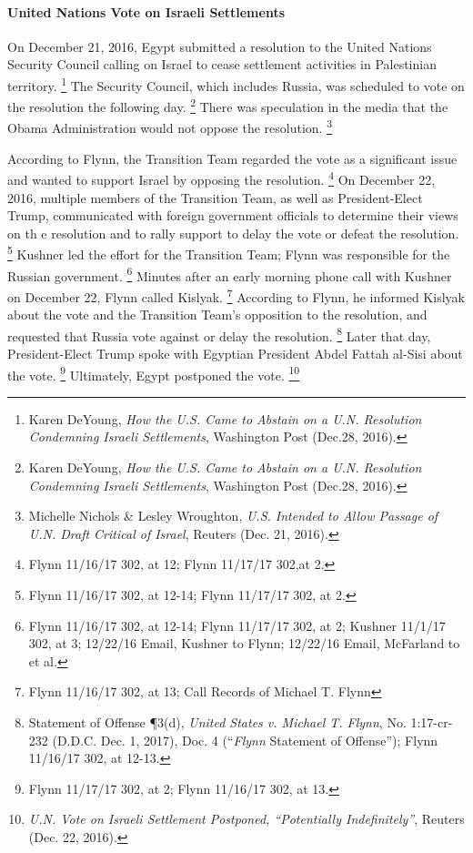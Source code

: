 \paragraph{United Nations Vote on Israeli Settlements}

On December 21, 2016, Egypt submitted a resolution to the United Nations Security Council calling on Israel to cease settlement activities in Palestinian territory.%
\footnote{Karen DeYoung, \textit{How the U.S. Came to Abstain on a U.N. Resolution Condemning Israeli Settlements}, Washington Post (Dec.28, 2016).}
The Security Council, which includes Russia, was scheduled to vote on the resolution the following day.%
\footnote{Karen DeYoung, \textit{How the U.S. Came to Abstain on a U.N. Resolution Condemning Israeli Settlements}, Washington Post (Dec.28, 2016).}
There was speculation in the media that the Obama Administration would not oppose the resolution.%
\footnote{Michelle Nichols \& Lesley Wroughton, \textit{U.S. Intended to Allow Passage of U.N. Draft Critical of Israel}, Reuters (Dec. 21, 2016).}

According to Flynn, the Transition Team regarded the vote as a significant issue and wanted to support Israel by opposing the resolution.%
\footnote{Flynn 11/16/17 302, at 12;
Flynn 11/17/17 302,at 2.}
On December 22, 2016, multiple members of the Transition Team, as well as President-Elect Trump, communicated with foreign government officials to determine their views on th e resolution and to rally support to delay the vote or defeat the resolution.%
\footnote{Flynn 11/16/17 302, at 12-14;
Flynn 11/17/17 302, at 2.}
Kushner led the effort for the Transition Team; Flynn was responsible for the Russian government.%
\footnote{Flynn 11/16/17 302, at 12-14;
Flynn 11/17/17 302, at 2;
Kushner 11/1/17 302, at 3;
12/22/16 Email, Kushner to Flynn;
12/22/16 Email, McFarland to  et al.}
Minutes after an early morning phone call with Kushner on December 22, Flynn called Kislyak.%
\footnote{Flynn 11/16/17 302, at 13;
Call Records of Michael T. Flynn }
According to Flynn, he informed Kislyak about the vote and the Transition Team's opposition to the resolution, and requested that Russia vote against or delay the resolution.%
\footnote{Statement of Offense \P 3(d), \textit{United States v. Michael T. Flynn}, No. 1:17-cr-232 (D.D.C. Dec. 1, 2017), Doc. 4 (“\textit{Flynn} Statement of Offense”);
Flynn 11/16/17 302, at 12-13.}
Later that day, President-Elect Trump spoke with Egyptian President Abdel Fattah al-Sisi about the vote.%
\footnote{Flynn 11/17/17 302, at 2;
Flynn 11/16/17 302, at 13.}
Ultimately, Egypt postponed the vote.%
\footnote{\textit{U.N. Vote on Israeli Settlement Postponed, “Potentially Indefinitely”}, Reuters (Dec. 22, 2016).}

